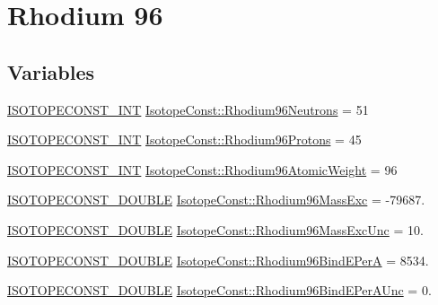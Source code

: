 \hypertarget{group___isotope_const-_rhodium-_rh96}{}\section{Rhodium 96}
\label{group___isotope_const-_rhodium-_rh96}
\subsection*{Variables}
\begin{DoxyCompactItemize}
\item 
\mbox{\hyperlink{group___isotope_const-_macros_ga5f18360b3e99483a35c32d789e62621c}{I\+S\+O\+T\+O\+P\+E\+C\+O\+N\+S\+T\+\_\+\+I\+NT}} \mbox{\hyperlink{group___isotope_const-_rhodium-_rh96_ga797aac072bc11c6dcc0227ef9e15c801}{Isotope\+Const\+::\+Rhodium96\+Neutrons}} = 51
\item 
\mbox{\hyperlink{group___isotope_const-_macros_ga5f18360b3e99483a35c32d789e62621c}{I\+S\+O\+T\+O\+P\+E\+C\+O\+N\+S\+T\+\_\+\+I\+NT}} \mbox{\hyperlink{group___isotope_const-_rhodium-_rh96_gacc099c058802423e19d8b878c5ef3784}{Isotope\+Const\+::\+Rhodium96\+Protons}} = 45
\item 
\mbox{\hyperlink{group___isotope_const-_macros_ga5f18360b3e99483a35c32d789e62621c}{I\+S\+O\+T\+O\+P\+E\+C\+O\+N\+S\+T\+\_\+\+I\+NT}} \mbox{\hyperlink{group___isotope_const-_rhodium-_rh96_ga79f67b2d005eb11d291729fcfa33110a}{Isotope\+Const\+::\+Rhodium96\+Atomic\+Weight}} = 96
\item 
\mbox{\hyperlink{group___isotope_const-_macros_ga8f45a7272ce02c0b4c65c44636ed719a}{I\+S\+O\+T\+O\+P\+E\+C\+O\+N\+S\+T\+\_\+\+D\+O\+U\+B\+LE}} \mbox{\hyperlink{group___isotope_const-_rhodium-_rh96_ga87648dd43dbec36e338a7681c08425f8}{Isotope\+Const\+::\+Rhodium96\+Mass\+Exc}} = -\/79687.
\item 
\mbox{\hyperlink{group___isotope_const-_macros_ga8f45a7272ce02c0b4c65c44636ed719a}{I\+S\+O\+T\+O\+P\+E\+C\+O\+N\+S\+T\+\_\+\+D\+O\+U\+B\+LE}} \mbox{\hyperlink{group___isotope_const-_rhodium-_rh96_ga1e5a27ed2d192fab28e31ebf2d97af26}{Isotope\+Const\+::\+Rhodium96\+Mass\+Exc\+Unc}} = 10.
\item 
\mbox{\hyperlink{group___isotope_const-_macros_ga8f45a7272ce02c0b4c65c44636ed719a}{I\+S\+O\+T\+O\+P\+E\+C\+O\+N\+S\+T\+\_\+\+D\+O\+U\+B\+LE}} \mbox{\hyperlink{group___isotope_const-_rhodium-_rh96_ga3f373e90e1f8229adb860766536e67d0}{Isotope\+Const\+::\+Rhodium96\+Bind\+E\+PerA}} = 8534.
\item 
\mbox{\hyperlink{group___isotope_const-_macros_ga8f45a7272ce02c0b4c65c44636ed719a}{I\+S\+O\+T\+O\+P\+E\+C\+O\+N\+S\+T\+\_\+\+D\+O\+U\+B\+LE}} \mbox{\hyperlink{group___isotope_const-_rhodium-_rh96_ga2de5d566a53454e394bd138fd8343844}{Isotope\+Const\+::\+Rhodium96\+Bind\+E\+Per\+A\+Unc}} = 0.

\end{DoxyCompactItemize}
